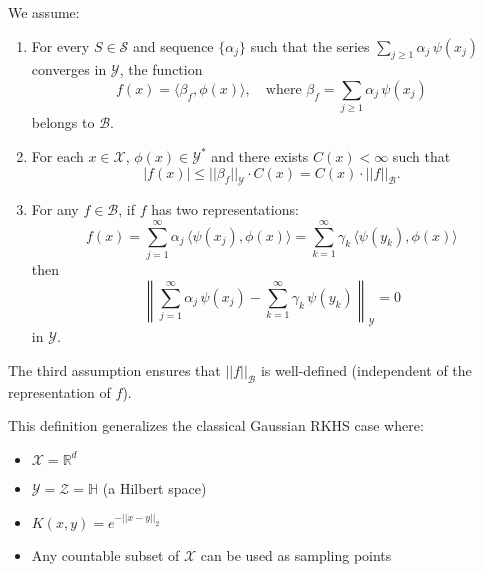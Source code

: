 \begin{definition}
We assume:
\begin{enumerate}
  \item For every $S \in \mathcal{S}$ and sequence $\{\alpha_j\}$ such that the series $\sum_{j\ge1}\alpha_j\, \psi(x_j)$ converges in $\mathcal{Y}$, the function
  \begin{equation}
  f(x) = \langle \beta_f, \phi(x) \rangle, \quad \text{where } \beta_f = \sum_{j\ge1}\alpha_j\, \psi(x_j)
  \end{equation}
  belongs to $\mathcal{B}$.
  
  \item For each $x\in\mathcal{X}$, $\phi(x)\in \mathcal{Y}^*$ and there exists $C(x)<\infty$ such that
  \begin{equation}
  |f(x)| \le ||\beta_f||_{\mathcal{Y}}\cdot C(x) = C(x)\cdot||f||_{\mathcal{B}}.
  \end{equation}

  \item For any $f \in \mathcal{B}$, if $f$ has two representations:
  \begin{equation}
  f(x) = \sum_{j=1}^\infty \alpha_j\, \langle \psi(x_j), \phi(x)\rangle = \sum_{k=1}^\infty \gamma_k\, \langle \psi(y_k), \phi(x)\rangle
  \end{equation}
  then
  \begin{equation}
  \left\|\sum_{j=1}^\infty \alpha_j\, \psi(x_j) - \sum_{k=1}^\infty \gamma_k\, \psi(y_k)\right\|_{\mathcal{Y}} = 0
  \end{equation}
  in $\mathcal{Y}$.
\end{enumerate}
\end{definition}

The third assumption ensures that $||f||_{\mathcal{B}}$ is well-defined (independent of the representation of $f$). 

\begin{remark}
This definition generalizes the classical Gaussian RKHS case where:
\begin{itemize}
    \item $\mathcal{X} = \mathbb{R}^d$
    \item $\mathcal{Y} = \mathcal{Z} = \mathbb{H}$ (a Hilbert space)
    \item $K(x,y) = e^{-||x-y||_2}$ 
    \item Any countable subset of $\mathcal{X}$ can be used as sampling points
\end{itemize}
\end{remark}

